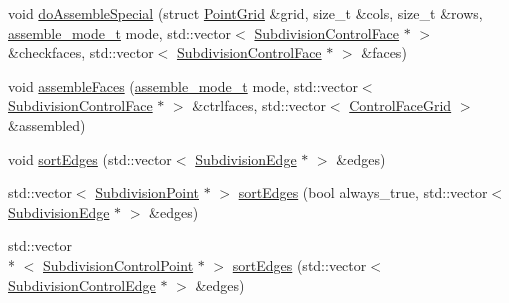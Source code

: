 \begin{DoxyCompactItemize}
\item 
void \hyperlink{classShipCAD_1_1SubdivisionSurface_a976e9b68dcbec8f6b424429a7e3c7e50}{do\-Assemble\-Special} (struct \hyperlink{structShipCAD_1_1PointGrid}{Point\-Grid} \&grid, size\-\_\-t \&cols, size\-\_\-t \&rows, \hyperlink{namespaceShipCAD_aaba70dc1c80dc540bef320cb9b720a20}{assemble\-\_\-mode\-\_\-t} mode, std\-::vector$<$ \hyperlink{classShipCAD_1_1SubdivisionControlFace}{Subdivision\-Control\-Face} $\ast$ $>$ \&checkfaces, std\-::vector$<$ \hyperlink{classShipCAD_1_1SubdivisionControlFace}{Subdivision\-Control\-Face} $\ast$ $>$ \&faces)
\item 
void \hyperlink{classShipCAD_1_1SubdivisionSurface_ab16b7b0697217616046ded3849af1f52}{assemble\-Faces} (\hyperlink{namespaceShipCAD_aaba70dc1c80dc540bef320cb9b720a20}{assemble\-\_\-mode\-\_\-t} mode, std\-::vector$<$ \hyperlink{classShipCAD_1_1SubdivisionControlFace}{Subdivision\-Control\-Face} $\ast$ $>$ \&ctrlfaces, std\-::vector$<$ \hyperlink{structShipCAD_1_1ControlFaceGrid}{Control\-Face\-Grid} $>$ \&assembled)
\item 
void \hyperlink{classShipCAD_1_1SubdivisionSurface_a2b270b878bb810d51bd7adf689db5366}{sort\-Edges} (std\-::vector$<$ \hyperlink{classShipCAD_1_1SubdivisionEdge}{Subdivision\-Edge} $\ast$ $>$ \&edges)
\item 
std\-::vector$<$ \hyperlink{classShipCAD_1_1SubdivisionPoint}{Subdivision\-Point} $\ast$ $>$ \hyperlink{classShipCAD_1_1SubdivisionSurface_abbabb02057a2e66d2a37ec84696788e9}{sort\-Edges} (bool always\-\_\-true, std\-::vector$<$ \hyperlink{classShipCAD_1_1SubdivisionEdge}{Subdivision\-Edge} $\ast$ $>$ \&edges)
\item 
std\-::vector\\*
$<$ \hyperlink{classShipCAD_1_1SubdivisionControlPoint}{Subdivision\-Control\-Point} $\ast$ $>$ \hyperlink{classShipCAD_1_1SubdivisionSurface_a8650bf95c9eb2de0e0b1342bfacbe82a}{sort\-Edges} (std\-::vector$<$ \hyperlink{classShipCAD_1_1SubdivisionControlEdge}{Subdivision\-Control\-Edge} $\ast$ $>$ \&edges)
\end{DoxyCompactItemize}
